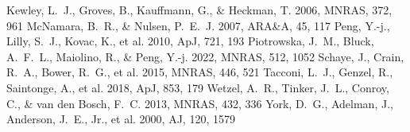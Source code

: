 \documentclass[twocolumn]{aastex631}
\begin{document}
\begin{thebibliography}{}
 Kewley, L.~J., Groves, B., Kauffmann, G., \& Heckman, T. 2006, MNRAS, 372, 961
 McNamara, B.~R., \& Nulsen, P.~E.~J. 2007, ARA\&A, 45, 117
 Peng, Y.-j., Lilly, S.~J., Kovac, K., et al. 2010, ApJ, 721, 193
 Piotrowska, J.~M., Bluck, A.~F.~L., Maiolino, R., \& Peng, Y.-j. 2022, MNRAS, 512, 1052
 Schaye, J., Crain, R.~A., Bower, R.~G., et al. 2015, MNRAS, 446, 521
 Tacconi, L.~J., Genzel, R., Saintonge, A., et al. 2018, ApJ, 853, 179
 Wetzel, A.~R., Tinker, J.~L., Conroy, C., \& van den Bosch, F.~C. 2013, MNRAS, 432, 336
 York, D.~G., Adelman, J., Anderson, J.~E., Jr., et al. 2000, AJ, 120, 1579
\end{thebibliography}
\end{document}
